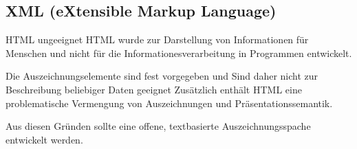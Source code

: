 \subsection{XML (eXtensible Markup Language)}

\begin{bonus}{HTML ungeeignet}
    HTML wurde zur Darstellung von Informationen für Menschen und nicht für die Informationesverarbeitung in Programmen entwickelt.

    Die Auszeichnungselemente sind fest vorgegeben und Sind daher nicht zur Beschreibung beliebiger Daten geeignet
    Zusätzlich enthält HTML eine problematische Vermengung von Auszeichnungen und Präsentationssemantik.

    Aus diesen Gründen sollte eine offene, textbasierte Auszeichnungsspache entwickelt werden.
\end{bonus}

